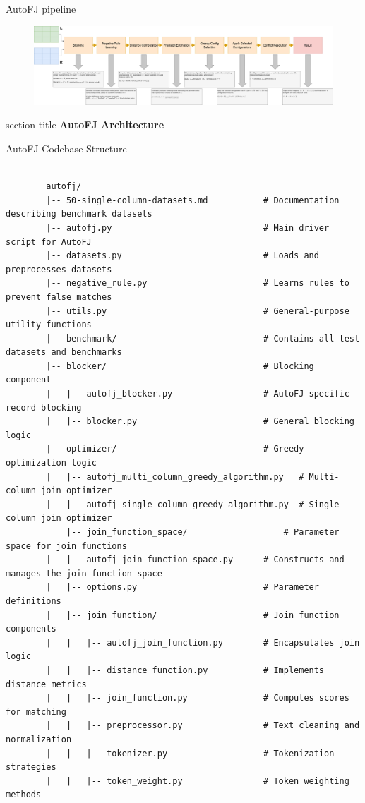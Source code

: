 \documentclass[8pt]{beamer} %
\begin{document}
\begin{frame}{AutoFJ pipeline}
	\begin{figure}
		\centering
		\includegraphics[width=1\linewidth]{img/img-pipeline}
	\end{figure}
	
\end{frame}



\begin{frame}[plain]
	\begin{beamercolorbox}[wd=\paperwidth,ht=0.7\paperheight,dp=2ex,center]{section title}
		\Huge \textbf{AutoFJ Architecture}
	\end{beamercolorbox}
\end{frame}

\begin{frame}[fragile]{AutoFJ Codebase Structure}
	\begin{verbatim}
		
		autofj/
		|-- 50-single-column-datasets.md           # Documentation describing benchmark datasets
		|-- autofj.py                              # Main driver script for AutoFJ
		|-- datasets.py                            # Loads and preprocesses datasets
		|-- negative_rule.py                       # Learns rules to prevent false matches
		|-- utils.py                               # General-purpose utility functions
		|-- benchmark/                             # Contains all test datasets and benchmarks
		|-- blocker/                               # Blocking component
		|   |-- autofj_blocker.py                  # AutoFJ-specific record blocking
		|   |-- blocker.py                         # General blocking logic
		|-- optimizer/                             # Greedy optimization logic
		|   |-- autofj_multi_column_greedy_algorithm.py   # Multi-column join optimizer
		|   |-- autofj_single_column_greedy_algorithm.py  # Single-column join optimizer
			|-- join_function_space/                   # Parameter space for join functions
		|   |-- autofj_join_function_space.py      # Constructs and manages the join function space
		|   |-- options.py                         # Parameter definitions
		|   |-- join_function/                     # Join function components
		|   |   |-- autofj_join_function.py        # Encapsulates join logic
		|   |   |-- distance_function.py           # Implements distance metrics
		|   |   |-- join_function.py               # Computes scores for matching
		|   |   |-- preprocessor.py                # Text cleaning and normalization
		|   |   |-- tokenizer.py                   # Tokenization strategies
		|   |   |-- token_weight.py                # Token weighting methods
	\end{verbatim}
\end{frame}
\end{document}
